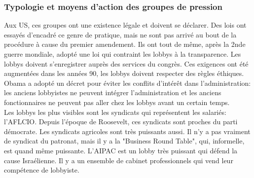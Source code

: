 \documentclass[10pt, a4paper, openany]{book}
\begin{document}
\subsubsection{Typologie et moyens d'action des groupes de pression}

Aux US, ces groupes ont une existence légale et doivent se déclarer. Des lois ont essayés d'encadré ce genre de pratique, mais ne sont pas arrivé au bout de la procédure à cause du premier amendement. Ils ont tout de même, après la 2nde guerre mondiale, adopté une loi qui contraint les lobbys à la transparence. Les lobbys doivent s'enregistrer auprès des services du congrès. Ces exigences ont été augmentées dans les années 90, les lobbys doivent respecter des règles éthiques. Obama a adopté un décret pour éviter les conflits d'intérêt dans l'administration: les anciens lobbyistes ne peuvent intégrer l'administration et les anciens fonctionnaires ne peuvent pas aller chez les lobbys avant un certain temps. \\
Les lobbys les plus visibles sont les syndicats qui représentent les salariés: l'AFLCIO. Depuis l'époque de Roosevelt, ces syndicats sont proches du parti démocrate. Les syndicats agricoles sont très puissants aussi. Il n'y a pas vraiment de syndicat du patronat, mais il y a la "Business Round Table", qui, informelle, est quand même puissante. L'AIPAC est un lobby très puissant qui défend la cause Israélienne. Il y a un ensemble de cabinet professionnels qui vend leur compétence de lobbyiste. 
\end{document}
